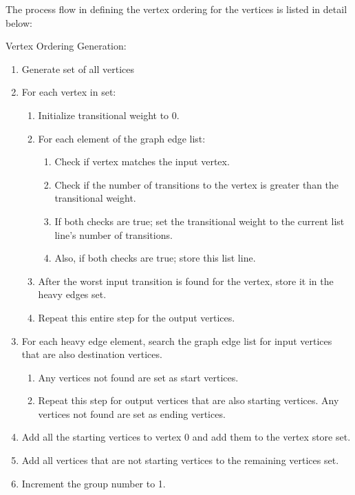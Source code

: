 \noindent The process flow in defining the vertex ordering for the vertices is
listed in detail below:

\begin{description}
    \item[Vertex Ordering Generation:]
\end{description}
 \begin{enumerate}
   \item Generate set of all vertices
   \item For each vertex in set:
   \begin{enumerate}
     \item Initialize transitional weight to 0.
     \item For each element of the graph edge list:
     \begin{enumerate}
       \item Check if vertex matches the input vertex.
       \item Check if the number of transitions to the vertex is greater than the
       transitional weight.
       \item If both checks are true; set the transitional weight to the current
       list line's number of transitions.
       \item Also, if both checks are true; store this list line.
     \end{enumerate}
     \item After the worst input transition is found for the vertex, store it in
     the heavy edges set.
     \item Repeat this entire step for the output vertices.
   \end{enumerate}
   \item For each heavy edge element, search the graph edge list
   for input vertices that are also destination vertices.
   \begin{enumerate}
     \item Any vertices not found are set as start vertices.
     \item Repeat this step for output vertices that are also starting vertices. 
     Any vertices not found are set as ending vertices.
   \end{enumerate}
   \item Add all the starting vertices to vertex 0 and add them to the vertex store
   set.
   \item Add all vertices that are not starting vertices to the remaining
   vertices set.
   \item Increment the group number to 1.

\end{enumerate}
